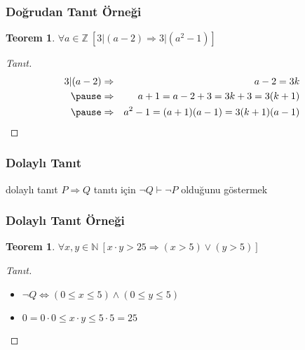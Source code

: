 \documentclass[dvipsnames]{beamer}
\theoremstyle{definition}
\theoremstyle{example}
\theoremstyle{plain}
\newtheorem{teorem}[theorem]{Teorem}
\begin{document}
\begin{frame}
  \frametitle{Doğrudan Tanıt Örneği}

  \begin{teorem}
    $\forall a \in \mathbb{Z}~[3 | (a-2) \Rightarrow 3 | (a^2-1)]$
  \end{teorem}

  \pause
  \begin{proof}[Tanıt]
    \begin{eqnarray*}
      3 | (a-2) & \Rightarrow & a-2 = 3k\\\pause
                & \Rightarrow & a+1 = a-2 + 3 = 3k+3 = 3(k+1)\\\pause
                & \Rightarrow & a^2-1 = (a+1)(a-1) = 3(k+1)(a-1)
    \end{eqnarray*}
  \end{proof}
\end{frame}

\begin{frame}
  \frametitle{Dolaylı Tanıt}

  \begin{block}{dolaylı tanıt}
    $P \Rightarrow Q$ tanıtı için $\neg Q \vdash \neg P$ olduğunu göstermek
  \end{block}
\end{frame}

\begin{frame}
  \frametitle{Dolaylı Tanıt Örneği}

  \begin{teorem}
    $\forall x,y \in \mathbb{N}~[x \cdot y > 25
      \Rightarrow (x > 5) \vee (y > 5)]$
  \end{teorem}

  \pause
  \begin{proof}[Tanıt]
    \begin{itemize}
      \item $\neg Q \Leftrightarrow (0 \leq x \leq 5) \wedge (0 \leq y \leq 5)$

      \pause
      \item $0 = 0 \cdot 0 \leq x \cdot y \leq 5 \cdot 5 = 25$
    \end{itemize}
  \end{proof}
\end{frame}
\end{document}
